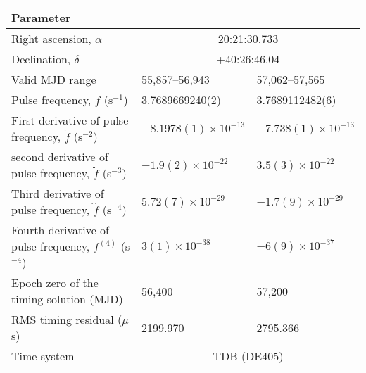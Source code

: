\documentclass[12pt,preprint]{aastex}
\newcommand{\psr}{PSR~J2021+4026}
\begin{document}
\begin{table*}[t]
  \begin{center}
    \caption[]{Local ephemerides of \psr\ derived from LAT data of MJD~55,857--56,943 (Determined by 69 TOAs) and 57,062--57,565 (Determined by 47 TOAs). The numbers in parentheses denote 1$\sigma$ errors in the last digit.\\}\label{ephemerides}
    \begin{tabular}{lll}
      \hline\hline
      \multicolumn{2}{l}{Parameter} \\
      \hline
      Right ascension, $\alpha$\dotfill & \multicolumn{2}{c}{20:21:30.733} \\
      Declination, $\delta$\dotfill &  \multicolumn{2}{c}{+40:26:46.04} \\
      Valid MJD range\dotfill & 55,857--56,943 & 57,062--57,565 \\
      Pulse frequency, $f$ (s$^{-1}$)\dotfill & 3.7689669240(2) & 3.7689112482(6) \\
      First derivative of pulse frequency, $\dot{f}$ (s$^{-2}$)\dotfill & $-8.1978(1)\times10^{-13}$ & $-7.738(1)\times10^{-13}$ \\
      second derivative of pulse frequency, $\ddot{f}$ (s$^{-3}$)\dotfill & $-1.9(2)\times10^{-22}$ & $3.5(3)\times10^{-22}$ \\
      Third derivative of pulse frequency, $\dddot{f}$ (s$^{-4}$)\dotfill & $5.72(7)\times10^{-29}$ & $-1.7(9)\times10^{-29}$\\
      Fourth derivative of pulse frequency, $f^{(4)}$ (s$^{-4}$)\dotfill & $3(1)\times10^{-38}$ & $-6(9)\times10^{-37}$\\
      Epoch zero of the timing solution (MJD)\dotfill & 56,400 & 57,200\\
      RMS timing residual ($\mu$s)\dotfill & 2199.970 & 2795.366\\
      Time system \dotfill & \multicolumn{2}{c}{TDB (DE405)} \\
      \hline
    \end{tabular}
  \end{center}
  \end{table*}
\end{document}
